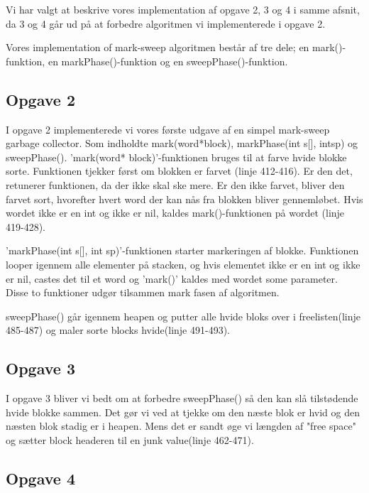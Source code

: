 Vi har valgt at beskrive vores implementation af opgave 2, 3 og 4 i samme afsnit, da 3 og 4 går ud på at forbedre algoritmen vi implementerede i opgave 2.

Vores implementation of mark-sweep algoritmen består af tre dele; en mark()-funktion, en markPhase()-funktion og en sweepPhase()-funktion. 

\subsection{Opgave 2}
\label{O2_2}
I opgave 2 implementerede vi vores første udgave af en simpel mark-sweep garbage collector. Som indholdte mark(word*block), markPhase(int s[], intsp) og sweepPhase().
'mark(word* block)'-funktionen bruges til at farve hvide blokke sorte. Funktionen tjekker først om blokken er farvet (linje 412-416). Er den det, retunerer funktionen, da der ikke skal ske mere. Er den ikke farvet, bliver den farvet sort, hvorefter hvert word der kan nås fra blokken bliver gennemløbet. Hvis wordet ikke er en int og ikke er nil, kaldes mark()-funktionen på wordet (linje 419-428).

'markPhase(int s[], int sp)'-funktionen starter markeringen af blokke. Funktionen looper igennem alle elementer på stacken, og hvis elementet ikke er en int og ikke er nil, castes det til et word og 'mark()' kaldes med wordet some parameter. Disse to funktioner udgør tilsammen mark fasen af algoritmen.

sweepPhase() går igennem heapen og putter alle hvide bloks over i freelisten(linje 485-487) og maler sorte blocks hvide(linje 491-493).

\subsection{Opgave 3}
\label{O2_3}
I opgave 3 bliver vi bedt om at forbedre sweepPhase() så den kan slå tilstødende hvide blokke sammen. Det gør vi ved at tjekke om den næste blok er hvid og den næsten blok stadig er i heapen. Mens det er sandt øge vi længden af "free space"  og sætter block headeren til en junk value(linje 462-471).
 
\subsection{Opgave 4}
\label{O2_4}


